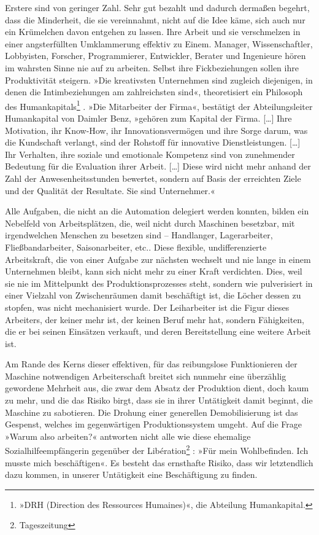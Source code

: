 Erstere sind von geringer Zahl. Sehr gut bezahlt und dadurch
dermaßen begehrt, dass die Minderheit, die sie vereinnahmt, nicht
auf die Idee käme, sich auch nur ein Krümelchen davon entgehen zu
lassen. Ihre Arbeit und sie verschmelzen in einer angsterfüllten
Umklammerung effektiv zu Einem. Manager, Wissenschaftler,
Lobbyisten, Forscher, Programmierer, Entwickler, Berater und
Ingenieure hören im wahrsten Sinne nie auf zu arbeiten. Selbst ihre
Fickbeziehungen sollen ihre Produktivität steigern. »Die
kreativsten Unternehmen sind zugleich diejenigen, in denen die
Intimbeziehungen am zahlreichsten sind«, theoretisiert ein
Philosoph des Humankapitals\footnote{
»DRH (Direction des Ressources Humaines)«, die Abteilung
Humankapital.
}%
. »Die Mitarbeiter der Firma«,
bestätigt der Abteilungsleiter Humankapital von Daimler Benz,
»gehören zum Kapital der Firma. […] Ihre Motivation, ihr Know-How,
ihr Innovationsvermögen und ihre Sorge darum, was die Kundschaft
verlangt, sind der Rohstoff für innovative Dienstleistungen. […]
Ihr Verhalten, ihre soziale und emotionale Kompetenz sind von
zunehmender Bedeutung für die Evaluation ihrer Arbeit. […] Diese
wird nicht mehr anhand der Zahl der Anwesenheitsstunden bewertet,
sondern auf Basis der erreichten Ziele und der Qualität der
Resultate. Sie sind Unternehmer.«

Alle Aufgaben, die nicht an die Automation delegiert werden
konnten, bilden ein Nebelfeld von Arbeitsplätzen, die, weil nicht
durch Maschinen besetzbar, mit irgendwelchen Menschen zu besetzen
sind – Handlanger, Lagerarbeiter, Fließbandarbeiter,
Saisonarbeiter, etc.. Diese flexible, undifferenzierte
Arbeitskraft, die von einer Aufgabe zur nächsten wechselt und nie
lange in einem Unternehmen bleibt, kann sich nicht mehr zu einer
Kraft verdichten. Dies, weil sie nie im Mittelpunkt des
Produktionsprozesses steht, sondern wie pulverisiert in einer
Vielzahl von Zwischenräumen damit beschäftigt ist, die Löcher
dessen zu stopfen, was nicht mechanisiert wurde. Der Leiharbeiter
ist die Figur dieses Arbeiters, der keiner mehr ist, der keinen
Beruf mehr hat, sondern Fähigkeiten, die er bei seinen Einsätzen
verkauft, und deren Bereitstellung eine weitere Arbeit ist.

Am Rande des Kerns dieser effektiven, für das reibungslose
Funktionieren der Maschine notwendigen Arbeiterschaft breitet sich
nunmehr eine überzählig gewordene Mehrheit aus, die zwar dem Absatz
der Produktion dient, doch kaum zu mehr, und die das Risiko birgt,
dass sie in ihrer Untätigkeit damit beginnt, die Maschine zu
sabotieren. Die Drohung einer generellen Demobilisierung ist das
Gespenst, welches im gegenwärtigen Produktionssystem umgeht. Auf
die Frage »Warum also arbeiten?« antworten nicht alle wie diese
ehemalige Sozialhilfeempfängerin gegenüber der Libération\footnote{
Tageszeitung
}%
: »Für
mein Wohlbefinden. Ich musste mich beschäftigen«. Es besteht das
ernsthafte Risiko, dass wir letztendlich dazu kommen, in unserer
Untätigkeit eine Beschäftigung zu finden.

